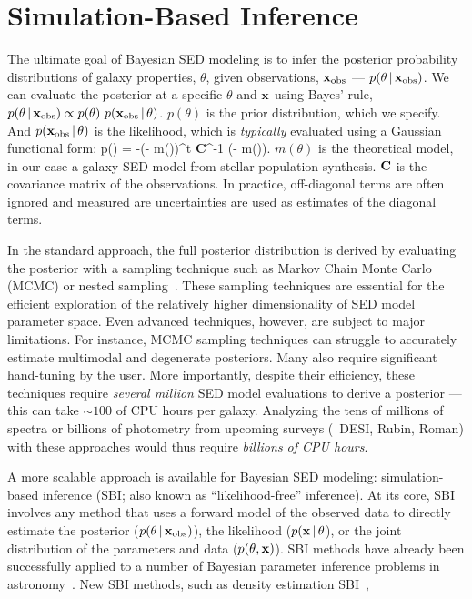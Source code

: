 \section{Simulation-Based Inference} \label{sec:sbi}
The ultimate goal of Bayesian SED modeling is to infer the posterior
probability distributions of galaxy properties, $\theta$, given observations,
${\bf x}_{\rm obs}$  --- $p(\theta\,|\,{\bf x}_{\rm obs})$.
We can evaluate the posterior at a specific $\theta$ and ${\bf x}$ using
Bayes' rule, $p(\theta\,|\,{\bf x}_{\rm obs}) \propto p(\theta)~p({\bf x}_{\rm obs}\,|\,\theta)$. 
$p(\theta)$ is the prior distribution, which we specify. 
And $p({\bf x}_{\rm obs}\,|\,\theta)$ is the likelihood, which is {\em typically}
evaluated using a Gaussian functional form: 
\beq
    \ln p(\xobs\given\theta) = -(\xobs - m(\theta))^t {\bf C}^{-1}
    (\xobs - m(\theta)).
\eeq
$m(\theta)$ is the theoretical model, in our case a galaxy SED model from
stellar population synthesis.
${\bf C}$ is the covariance matrix of the observations. 
In practice, off-diagonal terms are often ignored and measured are
uncertainties are used as estimates of the diagonal terms. 

In the standard approach, the full posterior distribution is derived by
evaluating the posterior with a sampling technique such as Markov Chain Monte
Carlo (MCMC) or nested sampling~\citep[\eg][]{carnall2017, leja2019b,
tacchella2021}.
These sampling techniques are essential for the efficient exploration of
the relatively higher dimensionality of SED model parameter space.
Even advanced techniques, however, are subject to major limitations.  
For instance, MCMC sampling techniques can struggle to accurately estimate
multimodal and degenerate posteriors. 
Many also require significant hand-tuning by the user.
More importantly, despite their efficiency, these techniques require {\em
several million} SED model evaluations to derive a posterior --- this can
take ${\sim}100$ of CPU hours per galaxy.
Analyzing the tens of millions of spectra or billions of photometry from
upcoming surveys (\eg~DESI, Rubin, Roman) with these approaches would thus
require {\em billions of CPU hours}.

A more scalable approach is available for Bayesian SED modeling:
simulation-based inference (SBI; also known as ``likelihood-free'' inference).
At its core, SBI involves any method that uses a forward model of the observed
data to directly estimate the posterior ($p(\theta\,|\,{\bf x}_{\rm obs})$), the
likelihood ($p({\bf x}\,|\, \theta$), or the joint distribution of the
parameters and data ($p(\theta, {\bf x})$). 
SBI methods have already been successfully applied to a number of Bayesian
parameter inference problems in astronomy~\citep{cameron2012, weyant2013,
hahn2017b, kacprzak2018, alsing2018, lange2020}.
New SBI methods, such as density estimation SBI~\citep[\eg][]{papmakario2017,
alsing2018, hahn2019c},

